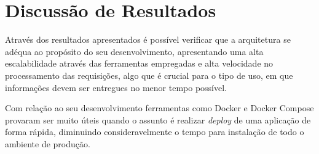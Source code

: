 \section{Discussão de Resultados}
\label{sec:discussãoresultados}
Através dos resultados apresentados é possível verificar que a arquitetura se adéqua ao propósito do seu desenvolvimento, apresentando uma alta escalabilidade através das ferramentas empregadas e alta velocidade no processamento das requisições, algo que é crucial para o tipo de uso, em que informações devem ser entregues no menor tempo possível.

Com relação ao seu desenvolvimento ferramentas como Docker e Docker Compose provaram ser muito úteis quando o assunto é realizar \textit{deploy} de uma aplicação de forma rápida, diminuindo consideravelmente o tempo para instalação de todo o ambiente de produção.